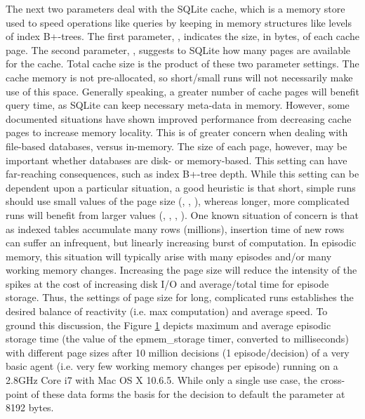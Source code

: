 The next two parameters deal with the SQLite cache, which is a memory store used to speed operations like queries by keeping in memory structures like levels of index B+-trees. 
The first parameter, , indicates the size, in bytes, of each cache page. 
The second parameter, , suggests to SQLite how many pages are available for the cache. 
Total cache size is the product of these two parameter settings. 
The cache memory is not pre-allocated, so short/small runs will not necessarily make use of this space. 
Generally speaking, a greater number of cache pages will benefit query time, as SQLite can keep necessary meta-data in memory. 
However, some documented situations have shown improved performance from decreasing cache pages to increase memory locality. 
This is of greater concern when dealing with file-based databases, versus in-memory. 
The size of each page, however, may be important whether databases are disk- or memory-based. 
This setting can have far-reaching consequences, such as index B+-tree depth. 
While this setting can be dependent upon a particular situation, a good heuristic is that short, simple runs should use small values of the page size (, , ), whereas longer, more complicated runs will benefit from larger values (, , , ). 
One known situation of concern is that as indexed tables accumulate many rows (\tild millions), insertion time of new rows can suffer an infrequent, but linearly increasing burst of computation. 
In episodic memory, this situation will typically arise with many episodes and/or many working memory changes. 
Increasing the page size will reduce the intensity of the spikes at the cost of increasing disk I/O and average/total time for episode storage. 
Thus, the settings of page size for long, complicated runs establishes the desired balance of reactivity (i.e. max computation) and average speed. 
To ground this discussion, the Figure \ref{fig:epmem-cache} depicts maximum and average episodic storage time (the value of the epmem\_storage timer, converted to milliseconds) with different page sizes after 10 million decisions (1 episode/decision) of a very basic agent (i.e. very few working memory changes per episode) running on a 2.8GHz Core i7 with Mac OS X 10.6.5. 
While only a single use case, the cross-point of these data forms the basis for the decision to default the parameter at 8192 bytes.

\begin{figure}
\label{fig:epmem-cache}
\end{figure}

